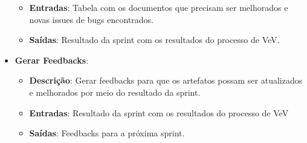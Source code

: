 \begin{itemize}
\begin{itemize}
    \item \textbf{Entradas}: Tabela com os documentos que precisam ser melhorados e novas issues de bugs encontrados.
    \item \textbf{Saídas}: Resultado da sprint com os resultados do processo de VeV.
  \end{itemize}
  \item \textbf{Gerar Feedbacks}:
  \begin{itemize}
    \item \textbf{Descrição}: Gerar feedbacks para que os artefatos possam ser atualizados e melhorados por meio do
    resultado da sprint.
    \item \textbf{Entradas}: Resultado da sprint com os resultados do processo de VeV
    \item \textbf{Saídas}: Feedbacks para a próxima sprint.
  \end{itemize}
\end{itemize}
